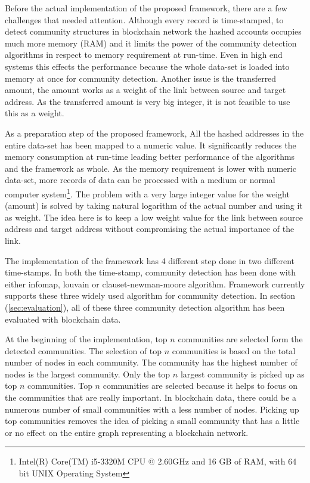 Before the actual implementation of the proposed framework, there are a few challenges that needed attention. Although every record is time-stamped, to detect community structures in blockchain network the hashed accounts occupies much more memory (RAM) and it limits the power of the community detection algorithms in respect to memory requirement at run-time. Even in high end systems this effects the performance because the whole data-set is loaded into memory at once for community detection. Another issue is the transferred amount, the amount works as a weight of the link between source and target address. As the transferred amount is very big integer, it is not feasible to use this as a weight. 

As a preparation step of the proposed framework, All the hashed addresses in the entire data-set has been mapped to a numeric value. It significantly reduces the memory consumption at run-time leading better performance of the algorithms and the framework as whole. As the memory requirement is lower with numeric data-set, more records of data can be processed with a medium or normal computer system\footnote{Intel(R) Core(TM) i5-3320M CPU @ 2.60GHz and 16 GB of RAM, with 64 bit UNIX Operating System}.  The problem with a very large integer value for the weight (amount) is solved by taking natural logarithm of the actual number and using it as weight. The idea here is to keep a low weight value for the link between source address and target address without compromising the actual importance of the link.

The implementation of the framework has 4 different step done in two different time-stamps. In both the time-stamp, community detection has been done with either infomap, louvain or clauset-newman-moore algorithm. Framework currently supports these three widely used algorithm for community detection. In section (\ref{sec:evaluation}), all of these three community detection algorithm has been evaluated with blockchain data.

At the beginning of the implementation, top $n$ communities are selected form the detected communities. The selection of top $n$ communities is based on the total number of nodes in each community. The community has the highest number of nodes is the largest community. Only the top $n$ largest community is picked up as top $n$ communities. Top $n$ communities are selected because it helps to focus on the communities that are really important. In blockchain data, there could be a numerous number of small communities with a less number of nodes. Picking up top communities removes the idea of picking a small community that has a little or no effect on the entire graph representing a blockchain network.

